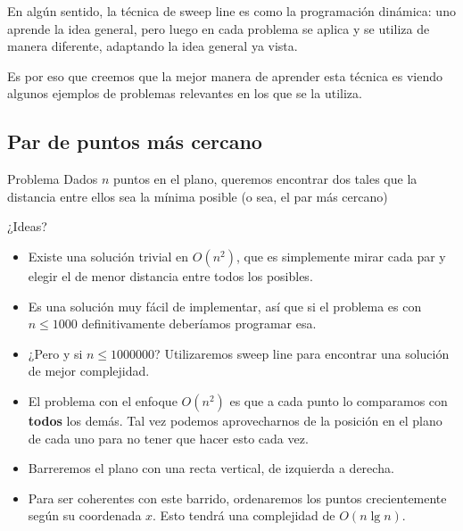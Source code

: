 \documentclass[compress]{beamer}
\begin{document}
\begin{frame}
En alg\'un sentido, la t\'ecnica de sweep line es como la programaci\'on din\'amica: uno aprende la idea general, pero luego en cada problema se aplica y se utiliza de manera diferente, adaptando la idea general ya vista.
\bigskip

Es por eso que creemos que la mejor manera de aprender esta t\'ecnica es viendo algunos ejemplos de problemas relevantes en los que se la utiliza.
\end{frame}

\subsection{Par de puntos m\'as cercano}

\begin{frame}
\begin{block}{Problema}
Dados $n$ puntos en el plano, queremos encontrar dos tales que la distancia entre ellos sea la m\'inima posible (o sea, el par m\'as cercano)
\end{block}
\bigskip
¿Ideas? \pause 
{}
\end{frame}

\begin{frame}
\begin{itemize}
\item Existe una soluci\'on trivial en $O(n^2)$, que es simplemente mirar cada par y elegir el de menor distancia entre todos los posibles.
\bigskip

\item Es una soluci\'on muy f\'acil de implementar, as\'i que si el problema es con $n \leq 1000$ definitivamente deber\'iamos programar esa.
\bigskip

\item ¿Pero y si $n\leq 1000000$? Utilizaremos sweep line para encontrar una soluci\'on de mejor complejidad.
\end{itemize}
\end{frame}

\begin{frame}
\begin{itemize}
\item El problema con el enfoque $O(n^2)$ es que a cada punto lo comparamos con \textbf{todos} los dem\'as. 
Tal vez podemos aprovecharnos de la posici\'on en el plano de cada uno para no tener que hacer esto cada vez.
\bigskip
\item Barreremos el plano con una recta vertical, de izquierda a derecha.
\bigskip
\item Para ser coherentes con este barrido, ordenaremos los puntos crecientemente seg\'un su coordenada $x$. 
Esto tendr\'a una complejidad de $O(n \lg n)$.
\end{itemize}
\end{frame}
\end{document}
